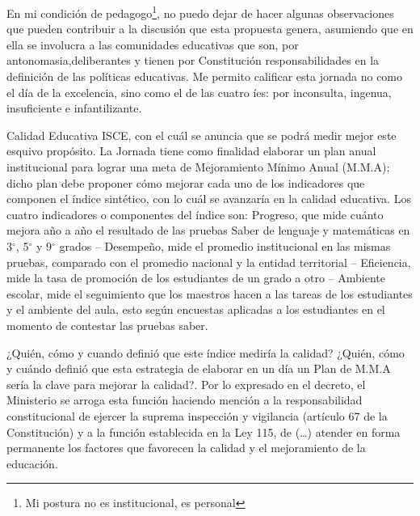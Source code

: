 \documentclass[10pt]{article}
\begin{document}
En mi condición de pedagogo\footnote{Mi	postura	no es institucional, es personal}, no puedo dejar de hacer algunas observaciones que pueden contribuir a la discusión que esta propuesta genera, asumiendo que en ella se involucra a las comunidades educativas que son, por antonomasia,deliberantes y tienen por Constitución responsabilidades en la definición de las políticas educativas. Me permito calificar esta jornada no como el día de la excelencia, sino como el de las cuatro íes: por inconsulta, ingenua, insuficiente e infantilizante.

Calidad Educativa ISCE, con el cuál se anuncia que se podrá medir mejor este esquivo propósito. La Jornada tiene como finalidad elaborar un plan anual institucional para lograr una meta de Mejoramiento Mínimo Anual (M.M.A); dicho plan debe proponer cómo mejorar cada uno de los indicadores que componen el índice sintético, con lo cuál se avanzaría en la calidad educativa. Los cuatro indicadores o componentes del índice son: Progreso, que mide cuánto mejora año a año el resultado de las pruebas Saber de lenguaje y matemáticas en 3$^{\circ}$, 5$^{\circ}$ y 9$^{\circ}$ grados -- Desempeño, mide el promedio institucional en las mismas pruebas, comparado con el promedio nacional y la entidad territorial -- Eficiencia, mide la tasa de promoción de los estudiantes de un grado a otro -- Ambiente escolar, mide el seguimiento que los maestros hacen a las tareas de los estudiantes y el ambiente del aula, esto según encuestas aplicadas a los estudiantes en el momento de contestar las pruebas saber.

¿Quién, cómo y cuando definió que este índice mediría la calidad? ¿Quién, cómo y cuándo definió que esta estrategia de elaborar en un día un Plan de M.M.A sería la clave para mejorar la calidad?. Por lo expresado en el decreto, el Ministerio se
arroga esta función haciendo mención a la responsabilidad constitucional de ejercer la suprema inspección y vigilancia (artículo 67 de la Constitución) y a la función establecida en la Ley 115, de  \guillemotleft(\ldots) atender en forma permanente los factores que favorecen la calidad y el mejoramiento de la educación\guillemotright.
\end{document}
